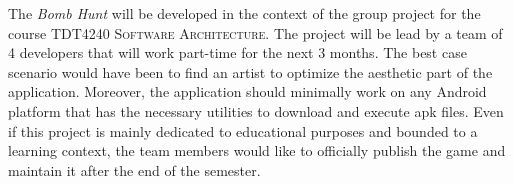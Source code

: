 The \textit{Bomb Hunt} will be developed in the context of the group project for the course \textsc{TDT4240 Software Architecture}. The project will be lead by a team of 4 developers that will work part-time for the next 3 months. The best case scenario would have been to find an artist to optimize the aesthetic part of the application. Moreover, the application should minimally work on any Android platform that has the necessary utilities to download and execute \gls{apk} files. Even if this project is mainly dedicated to educational purposes and bounded to a learning context, the team members would like to officially publish the game and maintain it after the end of the semester.
